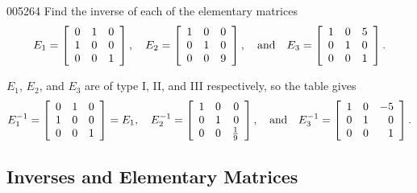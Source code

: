 \begin{example}{}{005264}
Find the inverse of each of the elementary matrices
\begin{equation*}
E_{1} = \left[ \begin{array}{rrr}
0 & 1 & 0 \\
1 & 0 & 0 \\
0 & 0 & 1
\end{array} \right], \quad
E_{2} = \left[ \begin{array}{rrr}
1 & 0 & 0 \\
0 & 1 & 0 \\
0 & 0 & 9
\end{array} \right], \quad \mbox{and} \quad
E_{3} = \left[ \begin{array}{rrr}
1 & 0 & 5 \\
0 & 1 & 0 \\
0 & 0 & 1
\end{array} \right].
\end{equation*}
\begin{solution}
  $E_{1}$, $E_{2}$, and $E_{3}$ are of type I, II, and III respectively, so the table gives
\begin{equation*}
E_{1}^{-1} = \left[ \begin{array}{rrr}
0 & 1 & 0 \\
1 & 0 & 0 \\
0 & 0 & 1
\end{array} \right] = E_{1}, \quad
E_{2}^{-1} = \left[ \begin{array}{rrr}
1 & 0 & 0 \\
0 & 1 & 0 \\
0 & 0 & \tfrac{1}{9}
\end{array} \right], \quad \mbox{and} \quad
E_{3}^{-1} = \left[ \begin{array}{rrr}
1 & 0 & -5 \\
0 & 1 & 0 \\
0 & 0 & 1
\end{array} \right].
\end{equation*}
\end{solution}
\end{example}

\subsection*{Inverses and Elementary Matrices}

